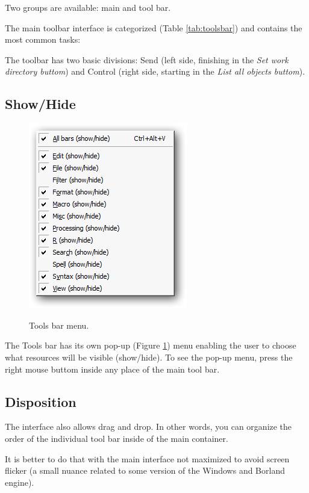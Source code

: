 Two groups are available: main and \RR{} tool bar.

The main toolbar interface is categorized
(Table \ref{tab:toolsbar})
and contains the most common tasks:

The \RR{} toolbar has two basic divisions: Send (left side, finishing in the
\textit{Set work directory buttom}) and Control (right side, starting
in the \textit{List all objects buttom}).


\hypertarget{working_toolsbar_showhide}{}
\subsection{Show/Hide}

\begin{figure}[h!]
  \includegraphics[scale=0.35]{./res/toolsbar_pmenu.png}\\
  \caption{Tools bar menu.}
  \label{fig:toolsbar_pmenu}
\end{figure}

The Tools bar has its own pop-up
(Figure \ref{fig:toolsbar_pmenu})
menu enabling the user to choose what
resources will be visible (show/hide). To see the pop-up menu, press the
right mouse buttom inside any place of the main tool bar.


\hypertarget{working_toolsbar_disposition}{}
\subsection{Disposition}

The interface also allows drag and drop. In other words, you can organize
the order of the individual tool bar inside of the main container.

It is better to do that with the main interface not maximized to avoid
screen flicker (a small nuance related to some version of the Windows
and Borland engine).
